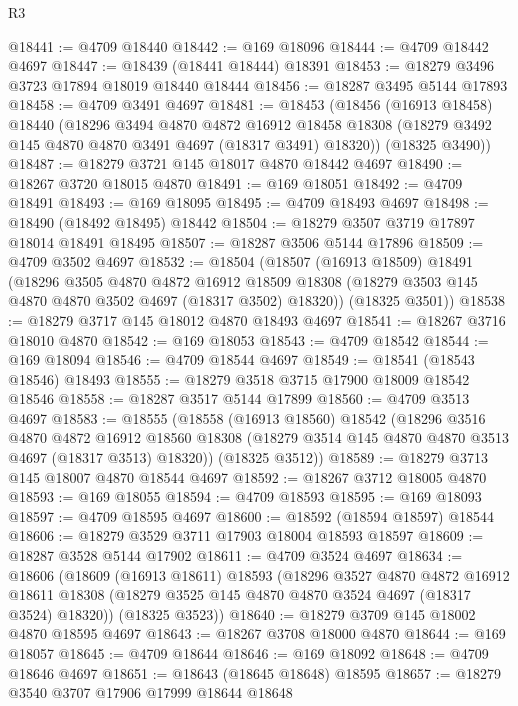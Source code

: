 \begin{lexlean}{R3}
\begin{coremodule}
@18441 := @4709 @18440
@18442 := @169 @18096
@18444 := @4709 @18442 @4697
@18447 := @18439 (@18441 @18444) @18391
@18453 := @18279 @3496 @3723 @17894 @18019 @18440 @18444
@18456 := @18287 @3495 @5144 @17893
@18458 := @4709 @3491 @4697
@18481 := @18453
    (@18456
      (@16913 @18458)
      @18440
      (@18296
        @3494
        @4870
        @4872
        @16912
        @18458
        @18308
        (@18279 @3492 @145 @4870 @4870 @3491 @4697 (@18317 @3491) @18320))
      (@18325 @3490))
@18487 := @18279 @3721 @145 @18017 @4870 @18442 @4697
@18490 := @18267 @3720 @18015 @4870
@18491 := @169 @18051
@18492 := @4709 @18491
@18493 := @169 @18095
@18495 := @4709 @18493 @4697
@18498 := @18490 (@18492 @18495) @18442
@18504 := @18279 @3507 @3719 @17897 @18014 @18491 @18495
@18507 := @18287 @3506 @5144 @17896
@18509 := @4709 @3502 @4697
@18532 := @18504
    (@18507
      (@16913 @18509)
      @18491
      (@18296
        @3505
        @4870
        @4872
        @16912
        @18509
        @18308
        (@18279 @3503 @145 @4870 @4870 @3502 @4697 (@18317 @3502) @18320))
      (@18325 @3501))
@18538 := @18279 @3717 @145 @18012 @4870 @18493 @4697
@18541 := @18267 @3716 @18010 @4870
@18542 := @169 @18053
@18543 := @4709 @18542
@18544 := @169 @18094
@18546 := @4709 @18544 @4697
@18549 := @18541 (@18543 @18546) @18493
@18555 := @18279 @3518 @3715 @17900 @18009 @18542 @18546
@18558 := @18287 @3517 @5144 @17899
@18560 := @4709 @3513 @4697
@18583 := @18555
    (@18558
      (@16913 @18560)
      @18542
      (@18296
        @3516
        @4870
        @4872
        @16912
        @18560
        @18308
        (@18279 @3514 @145 @4870 @4870 @3513 @4697 (@18317 @3513) @18320))
      (@18325 @3512))
@18589 := @18279 @3713 @145 @18007 @4870 @18544 @4697
@18592 := @18267 @3712 @18005 @4870
@18593 := @169 @18055
@18594 := @4709 @18593
@18595 := @169 @18093
@18597 := @4709 @18595 @4697
@18600 := @18592 (@18594 @18597) @18544
@18606 := @18279 @3529 @3711 @17903 @18004 @18593 @18597
@18609 := @18287 @3528 @5144 @17902
@18611 := @4709 @3524 @4697
@18634 := @18606
    (@18609
      (@16913 @18611)
      @18593
      (@18296
        @3527
        @4870
        @4872
        @16912
        @18611
        @18308
        (@18279 @3525 @145 @4870 @4870 @3524 @4697 (@18317 @3524) @18320))
      (@18325 @3523))
@18640 := @18279 @3709 @145 @18002 @4870 @18595 @4697
@18643 := @18267 @3708 @18000 @4870
@18644 := @169 @18057
@18645 := @4709 @18644
@18646 := @169 @18092
@18648 := @4709 @18646 @4697
@18651 := @18643 (@18645 @18648) @18595
@18657 := @18279 @3540 @3707 @17906 @17999 @18644 @18648

\end{coremodule}
\end{lexlean}
